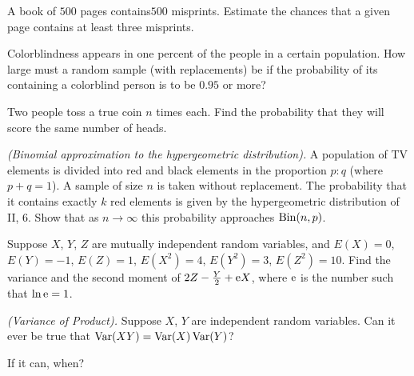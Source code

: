 \begin{problem}[Handout 8, \# 13]
  A book of \(\num{500}\) pages contains\(\num{500}\) misprints. Estimate
  the chances that a given page contains at least three misprints.
\end{problem}
\begin{solution}
\end{solution}


\begin{problem}[Handout 8, \# 14]
  Colorblindness appears in one percent of the people in a certain
  population. How large must a random sample (with replacements) be if the
  probability of its containing a colorblind person is to be \(0.95\) or
  more?
\end{problem}
\begin{solution}
\end{solution}

\begin{problem}[Handout 8, \# 15]
  Two people toss a true coin \(n\) times each. Find the probability that
  they will score the same number of heads.
\end{problem}
\begin{solution}
\end{solution}

\begin{problem}[Handout 8, \# 16]
  \emph{(Binomial approximation to the hypergeometric distribution).} A
  population of TV elements is divided into red and black elements in the
  proportion \(p:q\) (where \(p+q=1\)). A sample of size \(n\) is taken
  without replacement. The probability that it contains exactly \(k\) red
  elements is given by the hypergeometric distribution of II, 6. Show that
  as \(n\to\infty\) this probability approaches \(\operatorname{Bin}(n,p)\).
\end{problem}
\begin{solution}
\end{solution}

\begin{problem}[Handout 9, \# 3]
  Suppose \(X\), \(Y\), \(Z\) are mutually independent random variables,
  and \(E(X)=0\), \(E(Y)=-1\), \(E(Z)=1\), \(E(X^2)=4\), \(E(Y^2)=3\),
  \(E(Z^2)=10\). Find the variance and the second moment of
  \(2Z-\frac{Y}{2}+\mathrm{e} X\), where \(\mathrm{e}\) is the number such that
  \(\ln \mathrm{e}=1\).
\end{problem}
\begin{solution}
\end{solution}

\begin{problem}[Handout 9, \# 14]
  \emph{(Variance of Product).} Suppose \(X\), \(Y\) are independent random
  variables. Can it ever be true that \(\operatorname{Var}(XY)=\operatorname{Var}(X)\operatorname{Var}(Y)\)?

  \noindent If it can, when?
\end{problem}
\begin{solution}
\end{solution}

